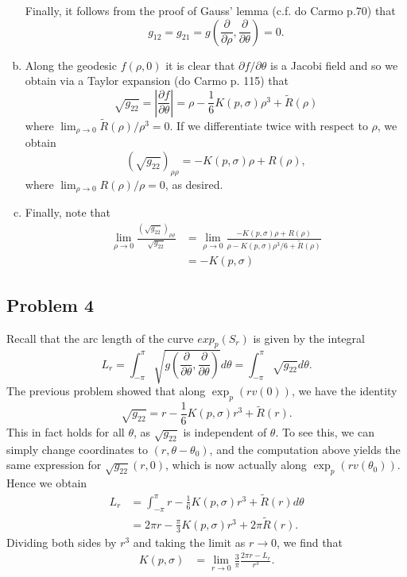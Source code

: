 \documentclass{../mathnotes}
\begin{document}
\begin{enumerate}[(a)]
        Finally, it follows from the proof of Gauss' lemma (c.f. do Carmo p.70) that
        \[g_{12}=g_{21}=g\left( \frac{\partial}{\partial\rho},\frac{\partial}{\partial\theta} \right)=0.\]
    \item Along the geodesic $f(\rho,0)$ it is clear that $\partial f/\partial\theta$ is a Jacobi field
        and so we obtain via a Taylor expansion (do Carmo p. 115) that
        \[\sqrt{g_{22}}=\left|\frac{\partial f}{\partial \theta}\right|=\rho-\frac{1}{6}K(p,\sigma)\rho^3+\tilde R(\rho)\]
        where $\lim_{\rho\to 0}\tilde R(\rho)/\rho^3=0$. If we differentiate twice with respect
        to $\rho$, we obtain
        \[(\sqrt{g_{22}})_{\rho\rho}=-K(p,\sigma)\rho+R(\rho),\]
        where $\lim_{\rho\to 0}R(\rho)/\rho=0$, as desired.
    \item Finally, note that
        \begin{align*}
            \lim_{\rho\to0}\frac{(\sqrt{g_{22}})_{\rho\rho}}{\sqrt{g_{22}}} &= \lim_{\rho\to 0}\frac{-K(p,\sigma)\rho+R(\rho)}{\rho-K(p,\sigma)\rho^3/6+\tilde R(\rho)}\\
            &=-K(p,\sigma)
        \end{align*}
\end{enumerate}

\subsection*{Problem 4}
Recall that the arc length of the curve $exp_p(S_r)$ is given by the integral
\[L_r=\int_{-\pi}^\pi\sqrt{g\left( \frac{\partial}{\partial\theta},\frac{\partial}{\partial\theta} \right)}d\theta=\int_{-\pi}^\pi\sqrt{g_22}d\theta.\]
The previous problem showed that along $\exp_p(rv(0))$, we have the identity
\[\sqrt{g_{22}} = r-\frac{1}{6}K(p,\sigma)r^3+\tilde R(r).\]
This in fact holds for all $\theta$, as $\sqrt{g_{22}}$ is independent of $\theta$. To
see this, we can simply change coordinates to $(r,\theta-\theta_0)$, and the computation
above yields the same expression for $\sqrt{g_{22}}(r,0)$, which is now actually
along $\exp_p(rv(\theta_0))$. Hence we obtain
\begin{align*}
    L_r &= \int_{-\pi}^{\pi} r-\frac{1}{6}K(p,\sigma)r^3+\tilde R(r) d\theta\\
    &= 2\pi r-\frac{\pi}{3}K(p,\sigma)r^3+2\pi\tilde R(r).
\end{align*}
Dividing both sides by $r^3$ and taking the limit as $r\to 0$, we find that
\begin{align*}
    K(p,\sigma) &= \lim_{r\to 0}\frac{3}{\pi}\frac{2\pi r-L_r}{r^3}.
\end{align*}
\end{document}
